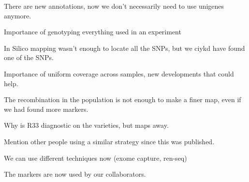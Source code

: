 There are new annotations, now we don't necessarily need to use unigenes anymore. 

Importance of genotyping everything used in an experiment

In Silico mapping wasn't enough to locate all the SNPs, but we ciykd have found one of the SNPs. 

Importance of uniform coverage across samples, new developments that could help. 

The recombination in the population is not enough to make a finer map, even if we had found more markers. 

Why is R33 diagnostic on the varieties, but maps away. 

Mention other people using a similar strategy since this was published. 

We can use different techniques now (exome capture, ren-seq)

The markers are now used by our collaborators. 